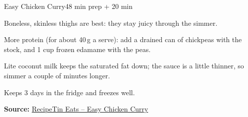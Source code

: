 \begin{recipebox}{Easy Chicken Curry}{4}{8 min prep + 20 min}
\begin{notelist}
  \item Boneless, skinless thighs are best: they stay juicy through the simmer.
  \item More protein (for about 40\,g a serve): add a drained can of chickpeas with
        the stock, and 1 cup frozen edamame with the peas.
  \item Lite coconut milk keeps the saturated fat down; the sauce is a little
        thinner, so simmer a couple of minutes longer.
  \item Keeps 3 days in the fridge and freezes well.
\end{notelist}

\noindent\textbf{Source:} \href{https://www.recipetineats.com/chicken-curry/}{RecipeTin Eats -- Easy Chicken Curry}

\end{recipebox}
